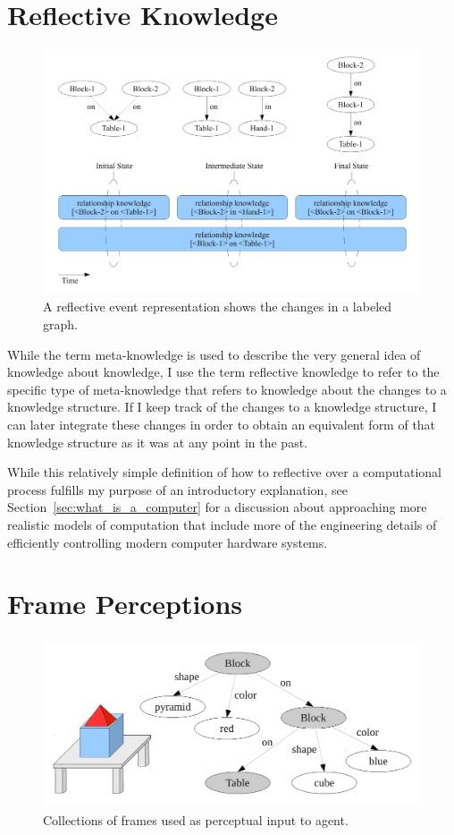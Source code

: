 \section{Reflective Knowledge}

\begin{figure}[bth]
  \center
  \includegraphics[width=12cm]{gfx/reflective_event_representation}
  \caption[A reflective event representation]{A reflective event representation shows the changes in a labeled graph.}
  \label{fig:reflective_event_representation}
\end{figure}


While the term meta-knowledge is used to describe the very general
idea of knowledge about knowledge, I use the term reflective
knowledge to refer to the specific type of meta-knowledge that refers
to knowledge about the changes to a knowledge structure.  If I keep
track of the changes to a knowledge structure, I can later integrate
these changes in order to obtain an equivalent form of that knowledge
structure as it was at any point in the past.

While this relatively simple definition of how to reflective over a
computational process fulfills my purpose of an introductory
explanation, see Section~\ref{sec:what_is_a_computer} for a discussion
about approaching more realistic models of computation that include
more of the engineering details of efficiently controlling modern
computer hardware systems.


\section{Frame Perceptions}

\begin{figure}[bth]
  \center
  \includegraphics[height=5cm]{gfx/frame_perception}
  \caption[Collections of frames used as perceptual input to agent.]{Collections of frames used as perceptual input to agent.}
  \label{fig:frame_perception}
\end{figure}

